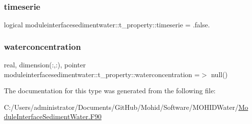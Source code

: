 \subsubsection{\texorpdfstring{timeserie}{timeserie}}
{\footnotesize\ttfamily logical moduleinterfacesedimentwater\+::t\+\_\+property\+::timeserie = .false.\hspace{0.3cm}{\ttfamily [private]}}

\mbox{\label{structmoduleinterfacesedimentwater_1_1t__property_a196c2229f0f04af4817809438737190c}} 
\subsubsection{\texorpdfstring{waterconcentration}{waterconcentration}}
{\footnotesize\ttfamily real, dimension(\+:,\+:), pointer moduleinterfacesedimentwater\+::t\+\_\+property\+::waterconcentration =$>$ null()\hspace{0.3cm}{\ttfamily [private]}}



The documentation for this type was generated from the following file\+:\begin{DoxyCompactItemize}
\item 
C\+:/\+Users/administrator/\+Documents/\+Git\+Hub/\+Mohid/\+Software/\+M\+O\+H\+I\+D\+Water/\mbox{\hyperlink{_module_interface_sediment_water_8_f90}{Module\+Interface\+Sediment\+Water.\+F90}}\end{DoxyCompactItemize}
